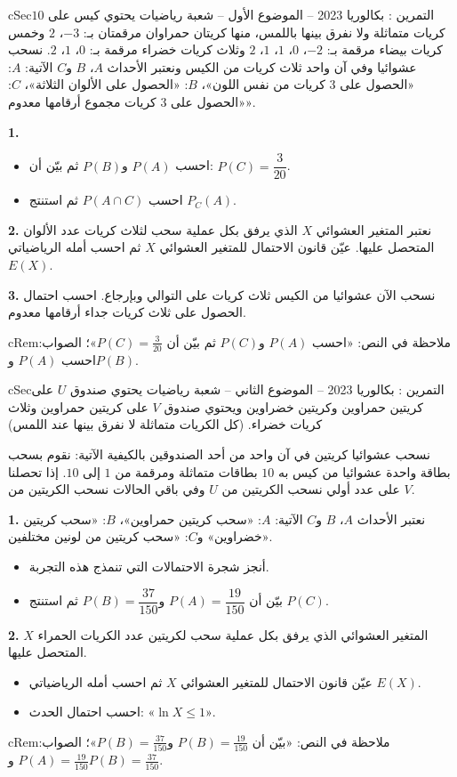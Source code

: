 \documentclass[12pt,a4paper]{article}
\newenvironment{BOX}[2]{\begin{otherlanguage}{english}\begin{arbox}{#1}{#2}}{\end{arbox}\end{otherlanguage}}
\newenvironment{molahada}[1][ملاحظة]{\begin{BOX}{cRem}{#1}}{\end{BOX}}
\newcounter{exo}
\newenvironment{tamrin}[1]{\stepcounter{exo}\begin{BOX}{cSec}{التمرين \theexo: #1}}{\end{BOX}}
\newenvironment{sq}{\begin{itemize}[leftmargin=2.4em,itemsep=3pt]}{\end{itemize}}
\newcommand{\qa}{\item[(أ)]}\newcommand{\qb}{\item[(ب)]}\newcommand{\qc}{\item[(جـ)]}\newcommand{\qd}{\item[(د)]}\newcommand{\qe}{\item[(هـ)]}
\newcommand{\QQ}[1]{\par\smallskip\textbf{#1.} }
\begin{document}
\begin{tamrin}{بكالوريا 2023 -- الموضوع الأول -- شعبة رياضيات}
يحتوي كيس على $10$ كريات متماثلة ولا نفرق بينها باللمس، منها كريتان حمراوان مرقمتان بـ: $-3$، $2$ وخمس كريات بيضاء مرقمة بـ: $-2$، $0$، $1$، $1$، $2$ وثلاث كريات خضراء مرقمة بـ: $0$، $1$، $2$.
نسحب عشوائيا وفي آن واحد ثلاث كريات من الكيس ونعتبر الأحداث $A$، $B$ و$C$ الآتية:
$A$: «الحصول على $3$ كريات من نفس اللون»، $B$: «الحصول على الألوان الثلاثة»، $C$: «الحصول على $3$ كريات مجموع أرقامها معدوم».

\QQ{1}
\begin{sq}
\qa احسب $P(A)$ و$P(B)$ ثم بيّن أن: $P(C)=\dfrac{3}{20}$.
\qb احسب $P(A\cap C)$ ثم استنتج $P_C(A)$.
\end{sq}
\QQ{2} نعتبر المتغير العشوائي $X$ الذي يرفق بكل عملية سحب لثلاث كريات عدد الألوان المتحصل عليها.
عيّن قانون الاحتمال للمتغير العشوائي $X$ ثم احسب أمله الرياضياتي $E(X)$.
\QQ{3} نسحب الآن عشوائيا من الكيس ثلاث كريات على التوالي وبإرجاع.
احسب احتمال الحصول على ثلاث كريات جداء أرقامها معدوم.
\end{tamrin}
\begin{molahada}
في النص: «احسب $P(A)$ و$P(C)$ ثم بيّن أن $P(C)=\frac{3}{20}$»؛ الصواب: احسب $P(A)$ و$P(B)$.
\end{molahada}

\begin{tamrin}{بكالوريا 2023 -- الموضوع الثاني -- شعبة رياضيات}
يحتوي صندوق $U$ على كريتين حمراوين وكريتين خضراوين ويحتوي صندوق $V$ على كريتين حمراوين وثلاث كريات خضراء. (كل الكريات متماثلة لا نفرق بينها عند اللمس)

نسحب عشوائيا كريتين في آن واحد من أحد الصندوقين بالكيفية الآتية:
نقوم بسحب بطاقة واحدة عشوائيا من كيس به $10$ بطاقات متماثلة ومرقمة من $1$ إلى $10$.
إذا تحصلنا على عدد أولي نسحب الكريتين من $U$ وفي باقي الحالات نسحب الكريتين من $V$.

\QQ{1} نعتبر الأحداث $A$، $B$ و$C$ الآتية: $A$: «سحب كريتين حمراوين»، $B$: «سحب كريتين خضراوين» و$C$: «سحب كريتين من لونين مختلفين».
\begin{sq}
\qa أنجز شجرة الاحتمالات التي تنمذج هذه التجربة.
\qb بيّن أن $P(A)=\dfrac{19}{150}$ و$P(B)=\dfrac{37}{150}$ ثم استنتج $P(C)$.
\end{sq}
\QQ{2} $X$ المتغير العشوائي الذي يرفق بكل عملية سحب لكريتين عدد الكريات الحمراء المتحصل عليها.
\begin{sq}
\qa عيّن قانون الاحتمال للمتغير العشوائي $X$ ثم احسب أمله الرياضياتي $E(X)$.
\qb احسب احتمال الحدث: «$\ln X\leqslant 1$».
\end{sq}
\end{tamrin}
\begin{molahada}
في النص: «بيّن أن $P(B)=\frac{19}{150}$ و$P(B)=\frac{37}{150}$»؛ الصواب: $P(A)=\frac{19}{150}$ و$P(B)=\frac{37}{150}$.
\end{molahada}
\end{document}
